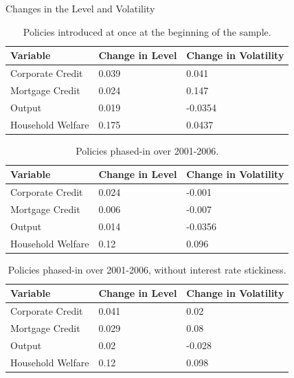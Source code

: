 \documentclass[8pt,aspectratio=169]{beamer}
\numberwithin{equation}{section}
\begin{document}
\begin{frame}{Changes in the Level and Volatility}

\begin{table}[h]
\caption{Policies introduced at once at the beginning of the sample. }
\begin{tabular}{l|l|l}
Variable &  Change in Level &  Change in Volatility \\
\hline
\hline
    Corporate Credit           &       0.039    &      0.041 \\
    Mortgage Credit            &      0.024    &       0.147 \\
    Output         &     0.019    &    -0.0354 \\ 
    Household Welfare       &     0.175     &     0.0437\\
\end{tabular}
\end{table}

\pause 

\begin{table}[h]
\caption{Policies phased-in over 2001-2006.}
\begin{tabular}{l|l|l}
\small
Variable &  Change in Level &  Change in Volatility \\
\hline
\hline
    Corporate Credit           &       0.024    &      -0.001 \\
    Mortgage Credit            &      0.006    &       -0.007 \\
    Output                      &     0.014    &    -0.0356 \\ 
    Household Welfare       &     0.12     &     0.096\\
\end{tabular}
\end{table}

\pause 


\begin{table}[h]
\caption{Policies phased-in over 2001-2006, without interest rate stickiness.}
\begin{tabular}{l|l|l}
\small
Variable &  Change in Level & Change in Volatility \\
\hline
\hline
    Corporate Credit           &       0.041    &     0.02 \\
    Mortgage Credit            &      0.029    &      0.08 \\
    Output                      &     0.02    &    -0.028 \\ 
    Household Welfare       &     0.12     &     0.098\\
\end{tabular}
\end{table}



\end{frame}
\end{document}
